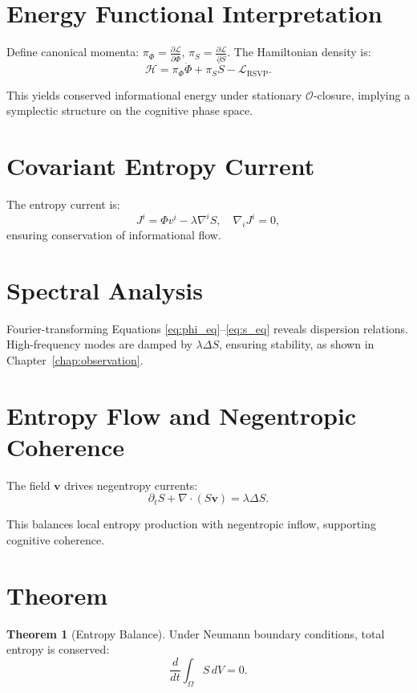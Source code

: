 \documentclass[12pt]{book}
\theoremstyle{definition}
\newtheorem{theorem}{Theorem}[chapter]
\begin{document}
\section{Energy Functional Interpretation}
Define canonical momenta: $\pi_\Phi = \frac{\partial \mathcal{L}}{\partial \dot{\Phi}}$, $\pi_S = \frac{\partial \mathcal{L}}{\partial \dot{S}}$. The Hamiltonian density is:
\begin{equation}
\mathcal{H} = \pi_\Phi \dot{\Phi} + \pi_S \dot{S} - \mathcal{L}_{\text{RSVP}}.
\end{equation}

This yields conserved informational energy under stationary $\mathcal{O}$-closure, implying a symplectic structure on the cognitive phase space.

\section{Covariant Entropy Current}
The entropy current is:
\begin{equation}
J^i = \Phi v^i - \lambda \nabla^i S, \quad \nabla_i J^i = 0,
\end{equation}
ensuring conservation of informational flow.

\section{Spectral Analysis}
Fourier-transforming Equations \eqref{eq:phi_eq}–\eqref{eq:s_eq} reveals dispersion relations. High-frequency modes are damped by $\lambda \Delta S$, ensuring stability, as shown in Chapter~\ref{chap:observation}.

\section{Entropy Flow and Negentropic Coherence}
The field $\mathbf{v}$ drives negentropy currents:
\begin{equation}
\partial_t S + \nabla \cdot (S \mathbf{v}) = \lambda \Delta S.
\end{equation}

This balances local entropy production with negentropic inflow, supporting cognitive coherence.

\section{Theorem}
\begin{theorem}[Entropy Balance]
\label{thm:entropy_balance}
Under Neumann boundary conditions, total entropy is conserved:
\begin{equation}
\frac{d}{dt}\int_\Omega S \, dV = 0.
\end{equation}
\end{theorem}
\end{document}
